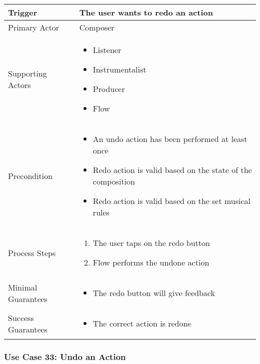 \begin{tabularx}{\textwidth}{|X|X|}
\hline
Trigger & 
The user wants to redo an action\\
\hline
Primary Actor & 
Composer \\
\hline
Supporting Actors & 
\begin{itemize}
\item Listener
\item Instrumentalist
\item Producer
\item Flow
\end{itemize} \\
\hline
Precondition & 
\begin{itemize}
\item An undo action has been performed at least once
\item Redo action is valid based on the state of the composition
\item Redo action is valid based on the set musical rules
\end{itemize} \\
\hline
Process Steps & 
\begin{enumerate}
\item The user taps on the redo button
\item Flow performs the undone action
\end{enumerate} \\
\hline
Minimal Guarantees & 
\begin{itemize}
  \item The redo button will give feedback 
\end{itemize}\\
\hline
Success Guarantees & 
\begin{itemize}
  \item The correct action is redone
\end{itemize} \\
\hline
\end{tabularx}

\subsubsection{Use Case 33: Undo an Action}

